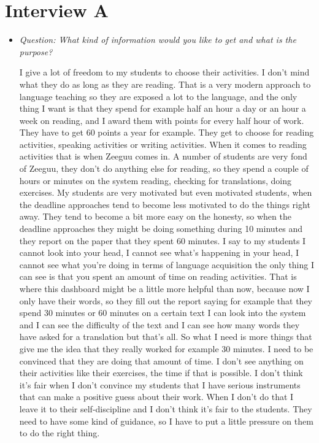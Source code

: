 \section*{Interview A}\label{interview01}
\begin{itemize}

	\item \textit{Question: What kind of information would you like to get and what is the purpose?}

I give a lot of freedom to my students to choose their activities. I don't mind what they do as long as they are reading. That is a very modern approach to language teaching so they are exposed a lot to the language, and the only thing I want is that they spend for example half an hour a day or an hour a week on reading, and I award them with points for every half hour of work. They have to get 60 points a year for example.
They get to choose for reading activities, speaking activities or writing activities. When it comes to reading activities that is when Zeeguu comes in. A number of students are very fond of Zeeguu, they don't do anything else for reading, so they spend a couple of hours or minutes on the system reading, checking for translations, doing exercises. My students are very motivated but even motivated students, when the deadline approaches tend to become less motivated to do the things right away. They tend to become a bit more easy on the honesty, so when the deadline approaches they might be doing something during 10 minutes and they report on the paper that they spent 60 minutes. I say to my students I cannot look into your head, I cannot see what's happening in your head, I cannot see what you're doing in terms of language acquisition the only thing I can see is that you spent an amount of time on reading activities. That is where this dashboard might be a little more helpful than now, because now I only have their words, so they fill out the report saying for example that they spend 30 minutes or 60 minutes on a certain text I can look into the system and I can see the difficulty of the text and I can see how many words they have asked for a translation but that's all. So what I need is more things that give me the idea that they really worked for example 30 minutes. I need to be convinced that they are doing that amount of time. 
I don't see anything on their activities like their exercises, the time if that is possible. 
I don't think it's fair when I don't convince my students that I have serious instruments that can make a positive guess about their work. When I don't do that I leave it to their self-discipline and I don't think it's fair to the students. They need to have some kind of guidance, so I have to put a little pressure on them to do the right thing.


\end{itemize}
